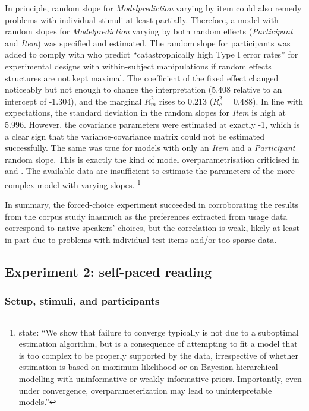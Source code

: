 In principle, random slope for \textit{Modelprediction} varying by item could also remedy problems with individual stimuli at least partially.
Therefore, a model with random slopes for \textit{Modelprediction} varying by both random effects (\textit{Participant} and \textit{Item}) was specified and estimated.
The random slope for participants was added to comply with \citet[257]{BarrEa2013} who predict ``catastrophically high Type I error rates'' for experimental designs with within-subject manipulations if random effects structures are not kept maximal.
The coefficient of the fixed effect changed noticeably but not enough to change the interpretation (5.408 relative to an intercept of -1.304), and the marginal $R^2_m$ rises to 0.213 ($R^2_c=0.488$).
In line with expectations, the standard deviation in the random slopes for \textit{Item} is high at 5.996.
However, the covariance parameters were estimated at exactly -1, which is a clear sign that the variance-covariance matrix could not be estimated successfully.
The same was true for models with only an \textit{Item} and a \textit{Participant} random slope.
This is exactly the kind of model overparametrisation criticised in \citet{BatesEa2015a} and \citet{MatuschekEa2017}.
The available data are insufficient to estimate the parameters of the more complex model with varying slopes.%
\footnote{\citet[1]{BatesEa2015a} state: ``We show that failure to converge typically is not due to a suboptimal estimation algorithm, but is a consequence of attempting to fit a model that is too complex to be properly supported by the data, irrespective of whether estimation is based on maximum likelihood or on Bayesian hierarchical modelling with uninformative or weakly informative priors.
Importantly, even under convergence, overparameterization may lead to uninterpretable models.''
}

In summary, the forced-choice experiment succeeded in corroborating the results from the corpus study inasmuch as the preferences extracted from usage data correspond to native speakers' choices, but the correlation is weak, likely at least in part due to problems with individual test items and\slash or too sparse data.


\subsection{Experiment 2: self-paced reading}
\label{sec:exp:spr}

\subsubsection{Setup, stimuli, and participants}

